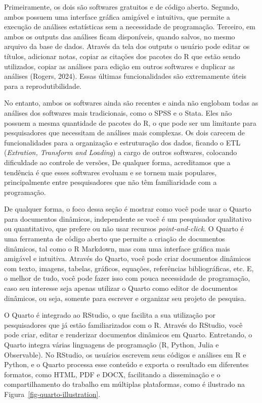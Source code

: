 \documentclass[
  a4paper,
]{book}
\begin{document}
Primeiramente, os dois são softwares gratuitos e de código aberto.
Segundo, ambos possuem uma interface gráfica amigável e intuitiva, que
permite a execução de análises estatísticas sem a necessidade de
programação. Terceiro, em ambos os outputs das análises ficam
disponíveis, quando salvos, no mesmo arquivo da base de dados. Através
da tela dos outputs o usuário pode editar os títulos, adicionar notas,
copiar as citações dos pacotes do R que estão sendo utilizados, copiar
as análises para edição em outros softwares e duplicar as análises
(Rogers, 2024). Essas últimas funcionalidades são extremamente úteis
para a reprodutibilidade.

No entanto, ambos os softwares ainda são recentes e ainda não englobam
todas as análises dos softwares mais tradicionais, como o SPSS e o
Stata. Eles não possuem a mesma quantidade de pacotes do R, o que pode
ser um limitante para pesquisadores que necessitam de análises mais
complexas. Os dois carecem de funcionalidades para a organização e
estruturação dos dados, ficando o ETL (\emph{Extration, Transform and
Loading}) a cargo de outros softwares, colocando dificuldade ao controle
de versões, De qualquer forma, acreditamos que a tendência é que esses
softwares evoluam e se tornem mais populares, principalmente entre
pesquisadores que não têm familiaridade com a programação.

De qualquer forma, o foco dessa seção é mostrar como você pode usar o
Quarto para documentos dinâmicos, independente se você é um pesquisador
qualitativo ou quantitativo, que prefere ou não usar recursos
\emph{point-and-click}. O Quarto é uma ferramenta de código aberto que
permite a criação de documentos dinâmicos, tal como o R Markdown, mas
com uma interface gráfica mais amigável e intuitiva. Através do Quarto,
você pode criar documentos dinâmicos com texto, imagens, tabelas,
gráficos, equações, referências bibliográficas, etc. E, o melhor de
tudo, você pode fazer isso com pouca necessidade de programação, caso
seu interesse seja apenas utilizar o Quarto como editor de documentos
dinâmicos, ou seja, somente para escrever e organizar seu projeto de
pesquisa.

O Quarto é integrado ao RStudio, o que facilita a sua utilização por
pesquisadores que já estão familiarizados com o R. Através do RStudio,
você pode criar, editar e renderizar documentos dinâmicos em Quarto.
Entretando, o Quarto integra várias linguagens de programação (R,
Python, Julia e Observable). No RStudio, os usuários escrevem seus
códigos e análises em R e Python, e o Quarto processa esse conteúdo e
exporta o resultado em diferentes formatos, como HTML, PDF e DOCX,
facilitando a disseminação e o compartilhamento do trabalho em múltiplas
plataformas, como é ilustrado na Figura~\ref{fig-quarto-illustration}.
\end{document}
